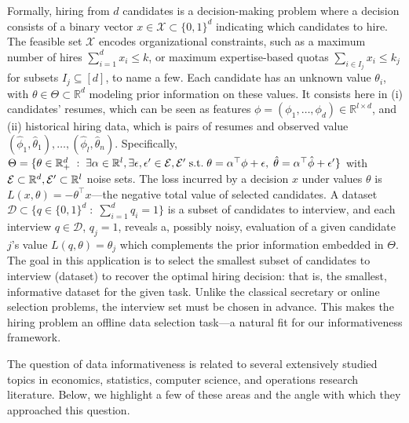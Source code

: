 \documentclass[11pt]{article}
\theoremstyle{plain}
\theoremstyle{definition}
\newcommand{\cX}{\mathcal{X}}
\newcommand{\cD}{\mathcal{D}}
\renewcommand{\Re}{\mathbb{R}}
\begin{document}
Formally, hiring from $d$ candidates is a decision-making problem where a decision consists of a binary vector $x \in  \cX \subset \{0,1\}^d$ indicating which candidates to hire. 
The feasible set $\cX$ encodes organizational constraints, such as a maximum number of hires $\sum_{i=1}^d x_i \leq k$, or maximum expertise-based quotas $\sum_{i \in I_j} x_i \leq k_j$ for subsets $I_j \subseteq [d]$, to name a few. 
Each candidate has an unknown value $\theta_i$, with $\theta \in \Theta \subset \Re^d$ modeling prior information on these values. It consists here in (i) candidates' resumes, which can be seen as features $\phi=(\phi_1,\dots,\phi_d) \in \Re^{l \times d}$, and (ii) historical hiring data, which is pairs of resumes and observed value $(\hat{\phi}_1,\hat{\theta}_1),\ldots,(\hat{\phi}_l, \hat{\theta}_n)$. Specifically, $\Theta = \{\theta \in \Re^d_+ \; : \; \exists \alpha \in \Re^l, \exists \epsilon,\epsilon' \in {\cal E},{\cal E}' \; \text{s.t.} \;  \theta = \alpha^\top \phi + \epsilon, \; \hat{\theta} = \alpha^\top \hat{\phi} + \epsilon' \}$ with ${\cal E} \subset \Re^d,{\cal E}' \subset \Re^l$ noise sets. The loss incurred by a decision $x$ under values $\theta$ is $L(x, \theta) = -\theta^\top x$---the negative total value of selected candidates.
A dataset $\cD \subset \{ q \in \{0,1\}^d \; : \; \sum_{i=1}^d q_i =1\}$ is a subset of candidates to interview, and each interview $q \in \cD$, $q_j=1$, reveals a, possibly noisy, evaluation of a given candidate $j$'s value $L(q,\theta) = \theta_j$ which complements the prior information embedded in $\Theta$. The goal in this application is to select the smallest subset of candidates to interview (dataset) to recover the optimal hiring decision: that is, the smallest, informative dataset for the given task.
Unlike the classical secretary or online selection problems, the interview set must be chosen in advance. This makes the hiring problem an offline data selection task---a natural fit for our informativeness framework.

The question of data informativeness is related to several extensively studied topics in economics, statistics, computer science, and operations research literature. Below, we highlight a few of these areas and the angle with which they approached this question.
\end{document}
